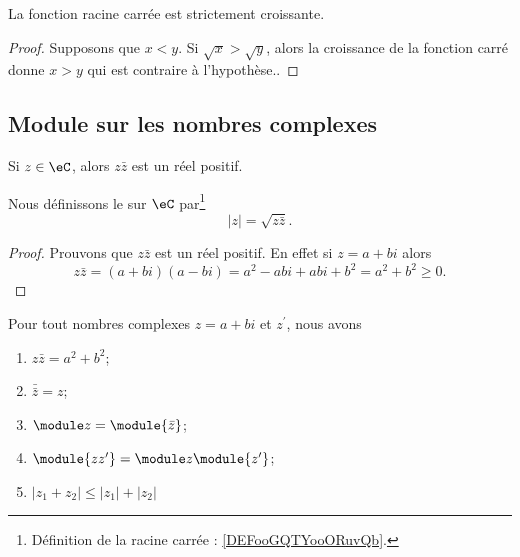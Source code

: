 \begin{lemma}       \label{LEMooSBOAooOOIotR}
    La fonction racine carrée est strictement croissante.
\end{lemma}

\begin{proof}
    Supposons que \( x<y\). Si \( \sqrt{ x }>\sqrt{ y }\), alors la croissance de la fonction carré donne \( x>y\) qui est contraire à l'hypothèse..
\end{proof}

\subsection{Module sur les nombres complexes}

\begin{lemmaDef}
    Si \( z\in \eC\), alors \( z\bar z\) est un réel positif.

    Nous définissons le  sur \( \eC\) par\footnote{Définition de la racine carrée : \ref{DEFooGQTYooORuvQb}.}
    \begin{equation}
        | z |=\sqrt{ z\bar z }.
    \end{equation}
\end{lemmaDef}

\begin{proof}
    Prouvons que \( z\bar z\) est un réel positif. En effet si \( z=a+bi\) alors
    \begin{equation}
        z\bar z=(a+bi)(a-bi)=a^2-abi+abi+b^2=a^2+b^2\geq 0.
    \end{equation}
\end{proof}

\begin{proposition}     \label{PROPooUMVGooIrhZZg}
Pour tout nombres complexes $z = a+bi$ et $z^\prime$, nous avons
   \begin{enumerate}
       \item    \label{ITEMooYBJVooGXiDSd}
       $z \bar z = a^2 + b^2$;
   \item        \label{ITEMooCGLSooKHbzkn}
       $\bar{\bar{z}} = z$;
   \item        \label{ITEMooDKWDooUjEuZA}
       $\module z = \module {\bar z}$;
   \item       
       \label{ITEMooFXKYooUOXbwH}
       $\module{zz^\prime} = \module z \module{z^\prime}$;        
   \item    \label{ITEMooDVMDooFDmOur}
      \( | z_1+z_2 |\leq | z_1 |+| z_2 |\)
   \end{enumerate}
\end{proposition}

